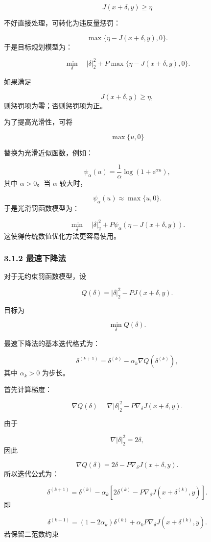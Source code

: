 ﻿\documentclass[UTF8,zihao=-4,fontset=none]{ctexart}
\begin{document}
\[
J(x+\delta,y)\ge \eta
\]

不好直接处理，可转化为违反量惩罚：

\[
\max\{\eta-J(x+\delta,y),0\}.
\]
\noindent 于是目标规划模型为：

\[
\min_{\delta}
\quad
|\delta|_2^2
+
P\max\{\eta-J(x+\delta,y),0\}.
\]

如果满足

\[
J(x+\delta,y)\ge \eta,
\]
\noindent 则惩罚项为零；否则惩罚项为正。

为了提高光滑性，可将

\[
\max\{u,0\}
\]

替换为光滑近似函数，例如：

\[
\psi_\alpha(u)
=
\frac{1}{\alpha}\log(1+\mathrm{e}^{\alpha u}),
\]
\noindent 其中 \(\alpha>0\)。当 \(\alpha\) 较大时，

\[
\psi_\alpha(u)\approx \max\{u,0\}.
\]
\noindent 于是光滑罚函数模型为：

\[
\min_{\delta}
\quad
|\delta|_2^2
+
P\psi_\alpha(\eta-J(x+\delta,y)).
\]
\noindent 这使得传统数值优化方法更容易使用。

\subsubsection*{3.1.2 最速下降法}
{}

对于无约束罚函数模型，设

\[
Q(\delta)
=
|\delta|_2^2-PJ(x+\delta,y).
\]

目标为

\[
\min_\delta Q(\delta).
\]

最速下降法的基本迭代格式为：

\[
\delta^{(k+1)}
=
\delta^{(k)}
-
\alpha_k\nabla Q(\delta^{(k)}),
\]
\noindent 其中 \(\alpha_k>0\) 为步长。

首先计算梯度：

\[
\nabla Q(\delta)
=
\nabla |\delta|_2^2
-
P\nabla_\delta J(x+\delta,y).
\]

由于

\[
\nabla |\delta|_2^2=2\delta,
\]
\noindent 因此

\[
\nabla Q(\delta)
=
2\delta
-
P\nabla_\delta J(x+\delta,y).
\]
\noindent 所以迭代公式为：

\[
\delta^{(k+1)}
=
\delta^{(k)}
-
\alpha_k
\left[
2\delta^{(k)}
-
P\nabla_\delta J(x+\delta^{(k)},y)
\right].
\]
\noindent 即

\[
\delta^{(k+1)}
=
(1-2\alpha_k)\delta^{(k)}
+
\alpha_k P\nabla_\delta J(x+\delta^{(k)},y).
\]
\noindent 若保留二范数约束
\end{document}
